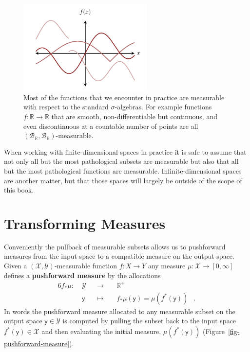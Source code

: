 \documentclass[
  letterpaper,
  DIV=11,
  numbers=noendperiod]{scrartcl}
\begin{document}
\begin{figure}

{\centering \includegraphics[width=0.6\textwidth,height=\textheight]{figures/measurable_functions/measurable_functions.pdf}

}

\caption{\label{fig-label}Most of the functions that we encounter in
practice are measurable with respect to the standard
\(\sigma\)-algebras. For example functions
\(f: \mathbb{R} \rightarrow \mathbb{R}\) that are smooth,
non-differentiable but continuous, and even discontinuous at a countable
number of points are all
\((\mathcal{B}_{\mathbb{R}}, \mathcal{B}_{\mathbb{R}})\)-measurable.}

\end{figure}

When working with finite-dimensional spaces in practice it is safe to
assume that not only all but the most pathological subsets are
measurable but also that all but the most pathological functions are
measurable. Infinite-dimensional spaces are another matter, but that
those spaces will largely be outside of the scope of this book.

\hypertarget{transforming-measures}{%
\section{Transforming Measures}\label{transforming-measures}}

Conveniently the pullback of measurable subsets allows us to pushforward
measures from the input space to a compatible measure on the output
space. Given a \((\mathcal{X}, \mathcal{Y})\)-measurable function
\(f : X \rightarrow Y\) any measure
\(\mu : \mathcal{X} \rightarrow [0, \infty]\) defines a
\textbf{pushforward measure} by the allocations \begin{alignat*}{6}
f_{*} \mu :\; & \mathcal{Y} & &\rightarrow& \; & \mathbb{R}^{+} &
\\
& \mathsf{y} & &\mapsto& &
f_{*} \mu (\mathsf{y}) = \mu(f^{*}(\mathsf{y})) &.
\end{alignat*} In words the pushforward measure allocated to any
measurable subset on the output space \(\mathsf{y} \in \mathcal{Y}\) is
computed by pulling the subset back to the input space
\(f^{*}(\mathsf{y}) \in \mathcal{X}\) and then evaluating the initial
measure, \(\mu(f^{*}(\mathsf{y}))\)
(Figure~\ref{fig-pushforward-measure}).
\end{document}
